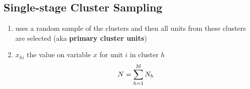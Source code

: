 \subsection{Single-stage Cluster Sampling \cite{ism-1}} \label{Single-stage Cluster Sampling}

\begin{enumerate}
    \item uses a random sample of the clusters and then all units from these clusters are selected (aka \textbf{primary cluster units})

    \item $x_{hi}$ the value on variable $x$ for unit $i$ in cluster $h$
    \[
        N = \displaystyle\sum_{h=1}^{M} N_h
    \]

    
\end{enumerate}

